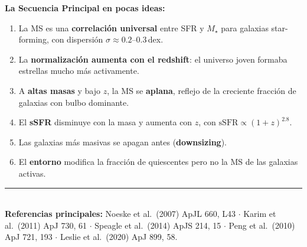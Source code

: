 \documentclass[12pt, a4paper]{article}
\begin{document}
\begin{center}
\colorbox{grisclaro}{%
\begin{minipage}{0.9\textwidth}
\vspace{0.5em}
\textbf{La Secuencia Principal en pocas ideas:}
\vspace{0.3em}
\begin{enumerate}[leftmargin=2em]
    \item La MS es una \textbf{correlación universal} entre SFR y $M_\star$
          para galaxias star-forming, con dispersión $\sigma \approx 0.2$--$0.3$\,dex.
    \item La \textbf{normalización aumenta con el redshift}: el universo
          joven formaba estrellas mucho más activamente.
    \item A \textbf{altas masas} y bajo $z$, la MS se \textbf{aplana}, reflejo
          de la creciente fracción de galaxias con bulbo dominante.
    \item El \textbf{sSFR} disminuye con la masa y aumenta con $z$,
          con $\mathrm{sSFR} \propto (1+z)^{2.8}$.
    \item Las galaxias más masivas se apagan antes (\textbf{downsizing}).
    \item El \textbf{entorno} modifica la fracción de quiescentes pero
          no la MS de las galaxias activas.
\end{enumerate}
\vspace{0.5em}
\end{minipage}}
\end{center}

\vspace{1cm}
\noindent\rule{\linewidth}{0.5pt}\\[0.3em]
{\small \textbf{Referencias principales:}
Noeske et al.\ (2007) ApJL 660, L43 $\cdot$
Karim et al.\ (2011) ApJ 730, 61 $\cdot$
Speagle et al.\ (2014) ApJS 214, 15 $\cdot$
Peng et al.\ (2010) ApJ 721, 193 $\cdot$
Leslie et al.\ (2020) ApJ 899, 58.}
\end{document}
